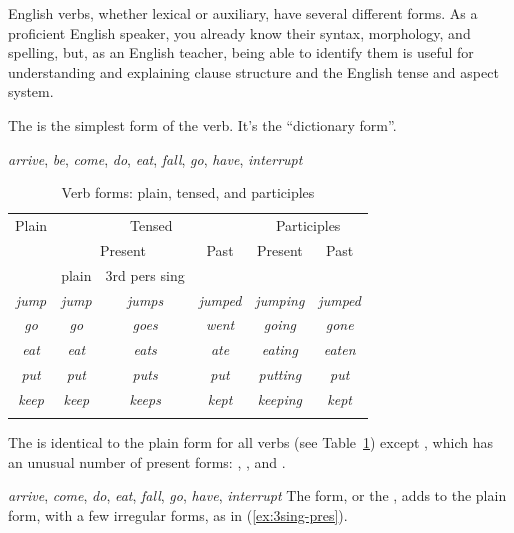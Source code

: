 English verbs, whether lexical or auxiliary, have several different forms. As a proficient English speaker, you already know their syntax, morphology, and spelling, but, as an English teacher, being able to identify them is useful for understanding and explaining clause structure and the English tense and aspect system.

The  is the simplest form of the verb. It's the ``dictionary form''.

\ea \emph{arrive}, \emph{be}, \emph{come}, \emph{do}, \emph{eat}, \emph{fall}, \emph{go}, \emph{have}, \emph{interrupt}
\z

\begin{table}
    \begin{tabular}{cccccc}
        \lsptoprule
        Plain & \multicolumn{3}{c}{Tensed} & \multicolumn{2}{c}{Participles} \\
        & \multicolumn{2}{c}{Present} & Past & Present & Past \\
        & plain & 3rd pers sing & &  &  \\
        \midrule
        \textit{jump} & \textit{jump} & \textit{jumps} & \textit{jumped} & \textit{jumping} & \textit{jumped} \\
        \textit{go} & \textit{go} & \textit{goes} & \textit{went} & \textit{going} & \textit{gone} \\
        \textit{eat} & \textit{eat} & \textit{eats} & \textit{ate} & \textit{eating} & \textit{eaten} \\
        \textit{put} & \textit{put} & \textit{puts} & \textit{put} & \textit{putting} & \textit{put} \\
        \textit{keep} & \textit{keep} & \textit{keeps} & \textit{kept} & \textit{keeping} & \textit{kept} \\
        \lspbottomrule
    \end{tabular}
    \caption{Verb forms: plain, tensed, and participles}
    \label{tab:verb-forms}
\end{table}
The  is identical to the plain form for all verbs (see Table~\ref{tab:verb-forms}) except , which has an unusual number of present forms: , , and .

\ea \emph{arrive}, \emph{come}, \emph{do}, \emph{eat}, \emph{fall}, \emph{go}, \emph{have}, \emph{interrupt}
\z
The  form, or the , adds  to the plain form, with a few irregular forms, as in (\ref{ex:3sing-pres}).

